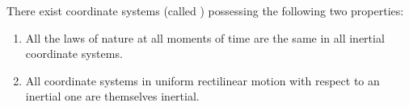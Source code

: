 There exist coordinate systems (called ) possessing the following two properties:

\begin{enumerate}
\item All the laws of nature at all moments of time are the same in all inertial coordinate systems.
\item All coordinate systems in uniform rectilinear motion with respect to an inertial one are themselves inertial.
\end{enumerate}
